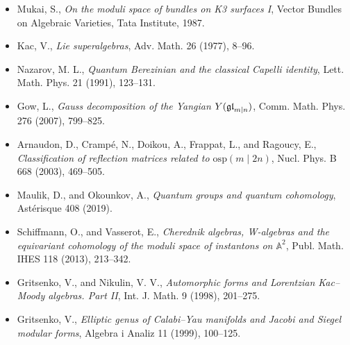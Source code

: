 \begin{itemize}
\item Mukai, S., \emph{On the moduli space of bundles on K3 surfaces I},
  Vector Bundles on Algebraic Varieties, Tata Institute, 1987.
\item Kac, V., \emph{Lie superalgebras}, Adv. Math. 26 (1977),
  8--96.
\item Nazarov, M. L., \emph{Quantum Berezinian and the classical
  Capelli identity}, Lett. Math. Phys. 21 (1991), 123--131.
\item Gow, L., \emph{Gauss decomposition of the Yangian
  \(Y(\mathfrak{gl}_{m|n})\)}, Comm. Math. Phys. 276 (2007), 799--825.
\item Arnaudon, D., Cramp\'e, N., Doikou, A., Frappat, L., and
  Ragoucy, E., \emph{Classification of reflection matrices related to
  \(\mathrm{osp}(m\mid 2n)\)}, Nucl. Phys. B 668 (2003), 469--505.
\item Maulik, D., and Okounkov, A., \emph{Quantum groups and quantum
  cohomology}, Ast\'erisque 408 (2019).
\item Schiffmann, O., and Vasserot, E., \emph{Cherednik algebras,
  W-algebras and the equivariant cohomology of the moduli space of
  instantons on \(\mathbb A^2\)}, Publ. Math. IHES 118 (2013),
  213--342.
\item Gritsenko, V., and Nikulin, V. V., \emph{Automorphic forms and
  Lorentzian Kac--Moody algebras. Part II}, Int. J. Math. 9 (1998),
  201--275.
\item Gritsenko, V., \emph{Elliptic genus of Calabi--Yau manifolds and
  Jacobi and Siegel modular forms}, Algebra i Analiz 11 (1999),
  100--125.
\end{itemize}
